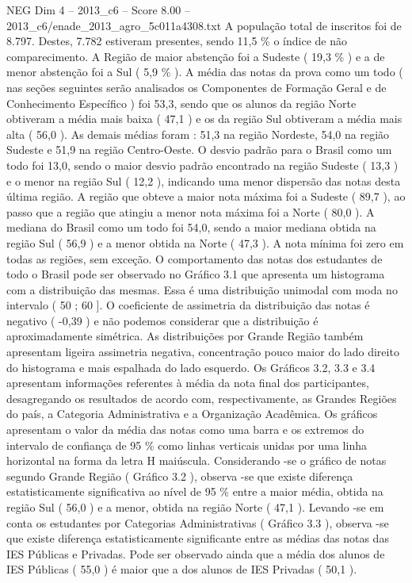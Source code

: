 \begin{textsample}{NEG Dim 4 – 2013\_c6 – Score 8.00 – 2013\_c6/enade\_2013\_agro\_5c011a4308.txt}
A população total de inscritos foi de 8.797.
Destes, 7.782 estiveram presentes, sendo 11,5 \% o índice de não comparecimento.
A Região de maior abstenção foi a Sudeste ( 19,3 \% ) e a de menor abstenção foi a Sul ( 5,9 \% ).
A média das notas da prova como um todo ( nas seções seguintes serão analisados os Componentes de Formação Geral e de Conhecimento Específico ) foi 53,3, sendo que os alunos da região Norte obtiveram a média mais baixa ( 47,1 ) e os da região Sul obtiveram a média mais alta ( 56,0 ).
As demais médias foram : 51,3 na região Nordeste, 54,0 na região Sudeste e 51,9 na região Centro-Oeste.
O desvio padrão para o Brasil como um todo foi 13,0, sendo o maior desvio padrão encontrado na região Sudeste ( 13,3 ) e o menor na região Sul ( 12,2 ), indicando uma menor dispersão das notas desta última região.
A região que obteve a maior nota máxima foi a Sudeste ( 89,7 ), ao passo que a região que atingiu a menor nota máxima foi a Norte ( 80,0 ).
A mediana do Brasil como um todo foi 54,0, sendo a maior mediana obtida na região Sul ( 56,9 ) e a menor obtida na Norte ( 47,3 ).
A nota mínima foi zero em todas as regiões, sem exceção.
O comportamento das notas dos estudantes de todo o Brasil pode ser observado no Gráfico 3.1 que apresenta um histograma com a distribuição das mesmas.
Essa é uma distribuição unimodal com moda no intervalo ( 50 ; 60 ].
O coeficiente de assimetria da distribuição das notas é negativo ( -0,39 ) e não podemos considerar que a distribuição é aproximadamente simétrica.
As distribuições por Grande Região também apresentam ligeira assimetria negativa, concentração pouco maior do lado direito do histograma e mais espalhada do lado esquerdo.
Os Gráficos 3.2, 3.3 e 3.4 apresentam informações referentes à média da nota final dos participantes, desagregando os resultados de acordo com, respectivamente, as Grandes Regiões do país, a Categoria Administrativa e a Organização Acadêmica.
Os gráficos apresentam o valor da média das notas como uma barra e os extremos do intervalo de confiança de 95 \% como linhas verticais unidas por uma linha horizontal na forma da letra H maiúscula.
Considerando -se o gráfico de notas segundo Grande Região ( Gráfico 3.2 ), observa -se que existe diferença estatisticamente significativa ao nível de 95 \% entre a maior média, obtida na região Sul ( 56,0 ) e a menor, obtida na região Norte ( 47,1 ).
Levando -se em conta os estudantes por Categorias Administrativas ( Gráfico 3.3 ), observa -se que existe diferença estatisticamente significante entre as médias das notas das IES Públicas e Privadas.
Pode ser observado ainda que a média dos alunos de IES Públicas ( 55,0 ) é maior que a dos alunos de IES Privadas ( 50,1 ).

\end{textsample}
